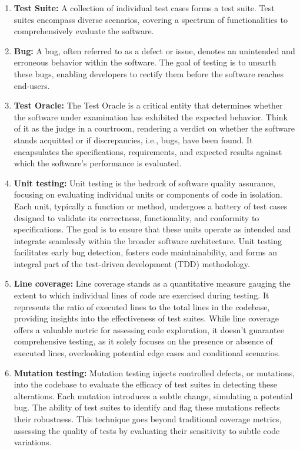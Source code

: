 \begin{enumerate}
  \item \textbf{Test Suite:} A collection of individual test cases forms a test suite. Test suites encompass diverse scenarios, covering a spectrum of functionalities to comprehensively evaluate the software.
  \item \textbf{Bug:} A bug, often referred to as a defect or issue, denotes an unintended and erroneous behavior within the software. The goal of testing is to unearth these bugs, enabling developers to rectify them before the software reaches end-users.
  \item \textbf{Test Oracle:} The Test Oracle is a critical entity that determines whether the software under examination 
  has exhibited the expected behavior. Think of it as the judge in a courtroom, rendering a verdict on whether the software stands acquitted or if discrepancies, i.e., bugs, have been found. It encapsulates the specifications, requirements, and expected results against which the software's performance is evaluated.
  \item \textbf{Unit testing:} Unit testing is the bedrock of software quality assurance, focusing on evaluating individual units or components of code in isolation. Each unit, typically a function or method, undergoes a battery of test cases designed to validate its correctness, functionality, and conformity to specifications. The goal is to ensure that these units operate as intended and integrate seamlessly within the broader software architecture. Unit testing facilitates early bug detection, fosters code maintainability, and forms an integral part of the test-driven development (TDD) methodology.
  \item \textbf{Line coverage:} Line coverage stands as a quantitative measure gauging the extent to which individual lines of code are exercised during testing. It represents the ratio of executed lines to the total lines in the codebase, providing insights into the effectiveness of test suites. While line coverage offers a valuable metric for assessing code exploration, it doesn't guarantee comprehensive testing, as it solely focuses on the presence or absence of executed lines, overlooking potential edge cases and conditional scenarios.
  \item \textbf{Mutation testing:} Mutation testing injects controlled defects, or mutations, into the codebase to evaluate the efficacy of test suites in detecting these alterations. Each mutation introduces a subtle change, simulating a potential bug. The ability of test suites to identify and flag these mutations reflects their robustness. This technique goes beyond traditional coverage metrics, assessing the quality of tests by evaluating their sensitivity to subtle code variations.

\end{enumerate}
